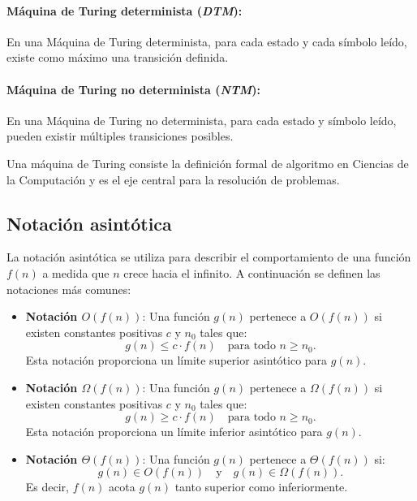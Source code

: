\documentclass{article}
\begin{document}
\paragraph{Máquina de Turing determinista (\textit{DTM}):}
En una Máquina de Turing determinista, para cada estado y cada símbolo leído, existe como máximo una transición
definida.
\paragraph{Máquina de Turing no determinista (\textit{NTM}):}
En una Máquina de Turing no determinista, para cada estado y símbolo leído, pueden existir múltiples
transiciones posibles.

Una máquina de Turing consiste la definición formal de algoritmo en Ciencias de la Computación y es el eje central para la resolución de problemas.

\subsection{Notación asintótica}

La notación asintótica se utiliza para describir el comportamiento de una función $f(n)$ a medida que $n$ crece hacia el infinito. A continuación se definen las notaciones más comunes:

\begin{itemize}
      \item \textbf{Notación $O(f(n))$}: Una función $g(n)$ pertenece a $O(f(n))$ si existen constantes positivas $c$ y $n_0$ tales que:
            \[
                  g(n) \leq c \cdot f(n) \quad \text{para todo } n \geq n_0.
            \]
            Esta notación proporciona un límite superior asintótico para $g(n)$.
            
      \item \textbf{Notación $\Omega(f(n))$}: Una función $g(n)$ pertenece a $\Omega(f(n))$ si existen constantes positivas $c$ y $n_0$ tales que:
            \[
                  g(n) \geq c \cdot f(n) \quad \text{para todo } n \geq n_0.
            \]
            Esta notación proporciona un límite inferior asintótico para $g(n)$.
            
      \item \textbf{Notación $\Theta(f(n))$}: Una función $g(n)$ pertenece a $\Theta(f(n))$ si:
            \[
                  g(n) \in O(f(n)) \quad \text{y} \quad g(n) \in \Omega(f(n)).
            \]
            Es decir, $f(n)$ acota $g(n)$ tanto superior como inferiormente.
\end{itemize}
\end{document}
